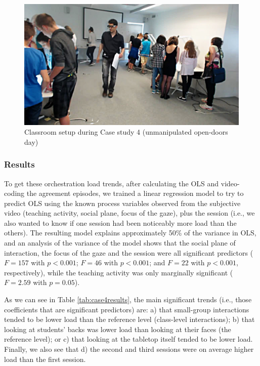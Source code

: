 \documentclass[10pt,journal,compsoc]{IEEEtran}
\begin{document}
\begin{figure}[!t]
\centering
\includegraphics[width=\linewidth]{img/Case4Picture}
\caption{Classroom setup during Case study 4 (unmanipulated open-doors day)}
\label{fig:case4picture}
\end{figure}

\subsubsection{Results}

To get these orchestration load trends, after calculating the OLS and video-coding the agreement episodes, we trained a linear regression model to try to predict OLS using the known process variables observed from the subjective video (teaching activity, social plane, focus of the gaze), plus the session (i.e., we also wanted to know if one session had been noticeably more load than the others). The resulting model explains approximately 50\% of the variance in OLS, and an analysis of the variance of the model shows that the social plane of interaction, the focus of the gaze and the session were all significant predictors ($F=157$ with $p<0.001$; $F=46$ with $p<0.001$; and $F=22$ with $p<0.001$, respectively), while the teaching activity was only marginally significant ($F=2.59$ with $p=0.05$).

As we can see in Table \ref{tab:case4results}, the main significant trends (i.e., those coefficients that are significant predictors) are: a) that small-group interactions tended to be lower load than the reference level (class-level interactions); b) that looking at students' backs was lower load than looking at their faces (the reference level); or c) that looking at the tabletop itself tended to be lower load. Finally, we also see that d) the second and third sessions were on average higher load than the first session.
\end{document}
